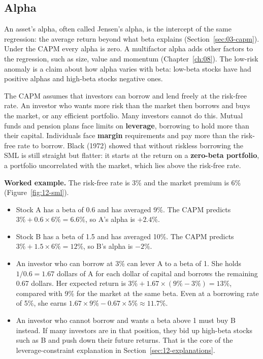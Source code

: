 \subsection{Alpha}

An asset's alpha, often called Jensen's alpha, is the intercept of the same regression: the average return beyond what beta explains (Section~\ref{sec:03-capm}). Under the CAPM every alpha is zero. A multifactor alpha adds other factors to the regression, such as size, value and momentum (Chapter~\ref{ch:08}). The low-risk anomaly is a claim about how alpha varies with beta: low-beta stocks have had positive alphas and high-beta stocks negative ones.

The CAPM assumes that investors can borrow and lend freely at the risk-free rate. An investor who wants more risk than the market then borrows and buys the market, or any efficient portfolio. Many investors cannot do this. Mutual funds and pension plans face limits on \textbf{leverage}, borrowing to hold more than their capital. Individuals face \textbf{margin} requirements and pay more than the risk-free rate to borrow. Black (1972) showed that without riskless borrowing the SML is still straight but flatter: it starts at the return on a \textbf{zero-beta portfolio}, a portfolio uncorrelated with the market, which lies above the risk-free rate.

\textbf{Worked example.} The risk-free rate is 3\% and the market premium is 6\% (Figure~\ref{fig:12-sml}).

\begin{itemize}
  \item Stock A has a beta of 0.6 and has averaged 9\%. The CAPM predicts $3\% + 0.6 \times 6\% = 6.6\%$, so A's alpha is $+2.4\%$.
  \item Stock B has a beta of 1.5 and has averaged 10\%. The CAPM predicts $3\% + 1.5 \times 6\% = 12\%$, so B's alpha is $-2\%$.
  \item An investor who can borrow at 3\% can lever A to a beta of 1. She holds $1/0.6 = 1.67$ dollars of A for each dollar of capital and borrows the remaining 0.67 dollars. Her expected return is $3\% + 1.67 \times (9\% - 3\%) = 13\%$, compared with 9\% for the market at the same beta. Even at a borrowing rate of 5\%, she earns $1.67 \times 9\% - 0.67 \times 5\% \approx 11.7\%$.
  \item An investor who cannot borrow and wants a beta above 1 must buy B instead. If many investors are in that position, they bid up high-beta stocks such as B and push down their future returns. That is the core of the leverage-constraint explanation in Section~\ref{sec:12-explanations}.
\end{itemize}

